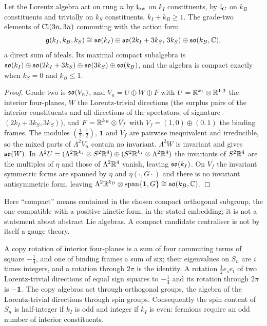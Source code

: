 \begin{theorem}
\label{thm:algebra}
Let the Lorentz algebra act on rung $n$ by $\mathfrak l_{\rm int}$ on $k_I$ constituents, by $\mathfrak l_G$ on $k_B$ constituents and trivially on $k_S$ constituents,
$k_I+k_B\ge1$. The grade-two elements of $\mathrm{Cl}(3n,3n)$ commuting with the action form
\[
\mathfrak g(k_I,k_B,k_S)\cong\mathfrak{so}(k_I)\oplus\mathfrak{so}(2k_I+3k_S,\,3k_S)\oplus\mathfrak{so}(k_B,\mathbb{C}),
\]
a direct sum of ideals. Its maximal compact subalgebra is $\mathfrak{so}(k_I)\oplus\mathfrak{so}(2k_I+3k_S)\oplus\mathfrak{so}(3k_S)\oplus\mathfrak{so}(k_B)$, and the algebra is
compact exactly when $k_S=0$ and $k_B\le1$.
\end{theorem}

\begin{proof}
Grade two is $\mathfrak{so}(V_n)$, and $V_n=U\oplus W\oplus F$ with $U=\mathbb{R}^{k_I}\otimes\mathbb{R}^{1,3}$ the interior four-planes, $W$ the Lorentz-trivial directions
(the surplus pairs of the interior constituents and all directions of the spectators, of signature $(2k_I+3k_S,3k_S)$), and $F=\mathbb{R}^{k_B}\otimes V_f$ with
$V_f=(1,0)\oplus(0,1)$ the binding frames. The modules $(\tfrac12,\tfrac12)$, $\mathbf1$ and $V_f$ are pairwise inequivalent and irreducible, so
the mixed parts of $\Lambda^2V_n$ contain no invariant. $\Lambda^2W$ is invariant and gives $\mathfrak{so}(W)$. In
$\Lambda^2U=(\Lambda^2\mathbb{R}^{k_I}\otimes S^2\mathbb{R}^4)\oplus(S^2\mathbb{R}^{k_I}\otimes\Lambda^2\mathbb{R}^4)$ the invariants of $S^2\mathbb{R}^4$ are the multiples of $\eta$ and those of
$\Lambda^2\mathbb{R}^4$ vanish, leaving $\mathfrak{so}(k_I)$. On $V_f$ the invariant symmetric forms are spanned by $\eta$ and $\eta(\cdot,G\cdot)$ and there is no invariant
antisymmetric form, leaving $\Lambda^2\mathbb{R}^{k_B}\otimes\operatorname{span}\{\mathbf 1,G\}\cong\mathfrak{so}(k_B,\mathbb{C})$.
\end{proof}

Here ``compact'' means contained in the chosen compact orthogonal subgroup, the one compatible with a positive kinetic form, in the stated
embedding; it is not a statement about abstract Lie algebras. A compact candidate centraliser is not by itself a gauge theory.

\begin{proposition}
\label{prop:orthospin}
A copy rotation of interior four-planes is a sum of four commuting terms of square $-\tfrac14$, and one of binding frames a sum of six; their eigenvalues
on $S_n$ are $i$ times integers, and a rotation through $2\pi$ is the identity. A rotation $\tfrac12e_se_t$ of two Lorentz-trivial directions of equal
sign squares to $-\tfrac14$ and its rotation through $2\pi$ is $-\mathbf 1$. The copy algebras act through orthogonal groups, the algebra of the Lorentz-trivial
directions through spin groups. Consequently the spin content of $S_n$ is half-integer if $k_I$ is odd and integer if $k_I$ is even: fermions require an
odd number of interior constituents.
\end{proposition}

